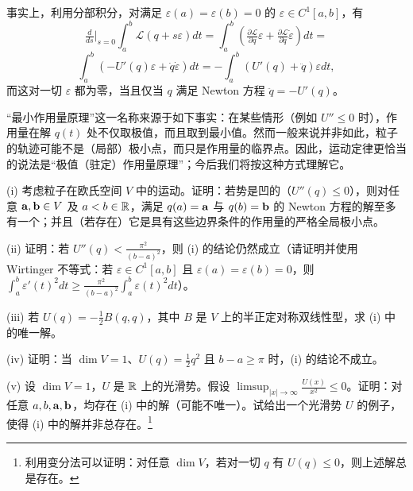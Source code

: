 事实上，利用分部积分，对满足 $\varepsilon(a)=\varepsilon(b)=0$ 的 $\varepsilon \in C^1[a,b]$，有
$$
\tfrac{d}{ds}|_{s=0}\int_a^b{\mathcal L}(q+s\varepsilon)dt=
\int_a^b(\tfrac{\partial \mathcal L}{\partial q}\varepsilon+
\tfrac{\partial \mathcal L}{\partial \dot{q}}\dot{\varepsilon})dt=
$$
$$
\int_a^b(-U'(q)\varepsilon+\dot{q}\dot{\varepsilon})dt=
-\int_a^b(U'(q)+\ddot{q})\varepsilon dt,
$$
而这对一切 $\varepsilon$ 都为零，当且仅当 $q$ 满足 Newton 方程 $\ddot{q}=-U'(q)$。


\begin{remark} “最小作用量原理”这一名称来源于如下事实：在某些情形（例如 $U''\le 0$ 时），作用量在解 $q(t)$ 处不仅取极值，而且取到最小值。然而一般来说并非如此，粒子的轨迹可能不是（局部）极小点，而只是作用量的临界点。因此，运动定律更恰当的说法是“极值（驻定）作用量原理”；今后我们将按这种方式理解它。
\end{remark}

\begin{exercise}\label{unii} (i) 考虑粒子在欧氏空间 $V$ 中的运动。证明：若势是凹的（$U''(q)\le 0$），则对任意 $\bold a,\bold b\in V$ 及 $a<b\in\Bbb R$，满足 $q(a)=\bold a$ 与 $q(b)=\bold b$ 的 Newton 方程的解至多有一个；并且（若存在）它是具有这些边界条件的作用量的严格全局极小点。

(ii) 证明：若 $U''(q)<\frac{\pi^2}{(b-a)^2}$，则 (i) 的结论仍然成立（请证明并使用 Wirtinger 不等式：若 $\varepsilon\in C^1[a,b]$ 且 $\varepsilon(a)=\varepsilon(b)=0$，则 $\int_a^b \varepsilon'(t)^2dt\ge \frac{\pi^2}{(b-a)^2}\int_a^b \varepsilon(t)^2dt$）。

(iii) 若 $U(q)=-\frac{1}{2}B(q,q)$，其中 $B$ 是 $V$ 上的半正定对称双线性型，求 (i) 中的唯一解。

(iv) 证明：当 $\dim V=1$、$U(q)=\frac{1}{2}q^2$ 且 $b-a\ge \pi$ 时，(i) 的结论不成立。

(v) 设 $\dim V=1$，$U$ 是 $\Bbb R$ 上的光滑势。假设 $\limsup_{|x|\to \infty}\frac{U(x)}{x^2}\le 0$。证明：对任意 $a,b,\bold a,\bold b$，均存在 (i) 中的解（可能不唯一）。试给出一个光滑势 $U$ 的例子，使得 (i) 中的解并非总存在。\footnote{利用变分法可以证明：对任意 $\dim V$，若对一切 $q$ 有 $U(q)\le 0$，则上述解总是存在。}
\end{exercise}

